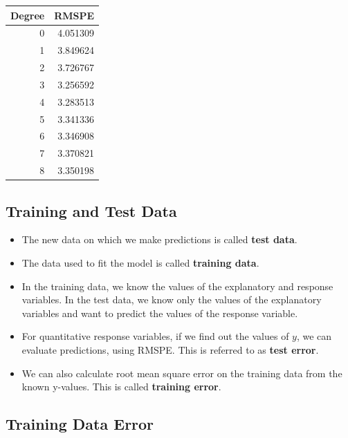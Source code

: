 \documentclass[]{book}
\begin{document}
\begin{tabular}{r|r}
\hline
Degree & RMSPE\\
\hline
0 & 4.051309\\
\hline
1 & 3.849624\\
\hline
2 & 3.726767\\
\hline
3 & 3.256592\\
\hline
4 & 3.283513\\
\hline
5 & 3.341336\\
\hline
6 & 3.346908\\
\hline
7 & 3.370821\\
\hline
8 & 3.350198\\
\hline
\end{tabular}

\subsection{Training and Test Data}\label{training-and-test-data}

\begin{itemize}
\item
  The new data on which we make predictions is called \textbf{test
  data}.
\item
  The data used to fit the model is called \textbf{training data}.
\item
  In the training data, we know the values of the explanatory and
  response variables. In the test data, we know only the values of the
  explanatory variables and want to predict the values of the response
  variable.
\item
  For quantitative response variables, if we find out the values of
  \(y\), we can evaluate predictions, using RMSPE. This is referred to
  as \textbf{test error}.
\item
  We can also calculate root mean square error on the training data from
  the known y-values. This is called \textbf{training error}.
\end{itemize}

\subsection{Training Data Error}\label{training-data-error}
\end{document}
